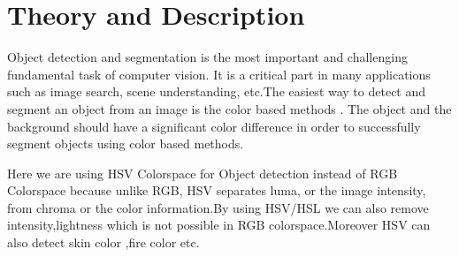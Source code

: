 \documentclass[11pt,a4paper]{article}
\begin{document}
	\section{Theory and Description}
	 Object detection and segmentation is the most important and challenging fundamental task of computer vision.  It is a critical part in many applications such as image search, scene understanding, etc.The easiest way to detect and segment an object from an image is the color based methods . The object and the background should have a significant color difference in order to successfully  segment objects using color based methods.
		\par Here we are using HSV Colorspace for Object detection instead of RGB Colorspace because unlike RGB, HSV separates luma, or the image intensity, from chroma or the color information.By using HSV/HSL we can also remove intensity,lightness which is not possible in RGB colorspace.Moreover HSV can also detect skin color ,fire color etc. 
\end{document}
